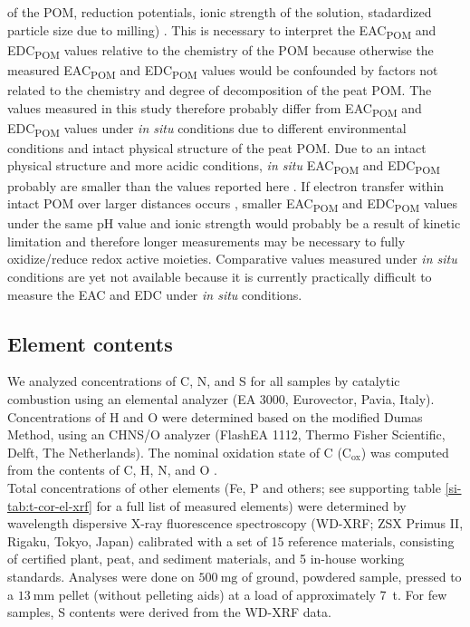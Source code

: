 \documentclass[draft,linenumbers]{agujournal2018}
\begin{document}
of the POM, reduction potentials, ionic strength of the solution,
stadardized particle size due to milling)
\citep{Aeschbacher.2012, Lu.2015}. This is necessary to interpret the
EAC\textsubscript{POM} and EDC\textsubscript{POM} values relative to the
chemistry of the POM because otherwise the measured
EAC\textsubscript{POM} and EDC\textsubscript{POM} values would be
confounded by factors not related to the chemistry and degree of
decomposition of the peat POM. The values measured in this study
therefore probably differ from EAC\textsubscript{POM} and
EDC\textsubscript{POM} values under \emph{in situ} conditions due to
different environmental conditions and intact physical structure of the
peat POM. Due to an intact physical structure and more acidic
conditions, \emph{in situ} EAC\textsubscript{POM} and
EDC\textsubscript{POM} probably are smaller than the values reported
here \citep{Aeschbacher.2012, Lu.2015}. If electron transfer within
intact POM over larger distances occurs \citep{Bai.2020}, smaller
EAC\textsubscript{POM} and EDC\textsubscript{POM} values under the same
pH value and ionic strength would probably be a result of kinetic
limitation and therefore longer measurements may be necessary to fully
oxidize/reduce redox active moieties. Comparative values measured under
\emph{in situ} conditions are yet not available because it is currently
practically difficult to measure the EAC and EDC under \emph{in situ}
conditions.

\subsection{Element contents}

We analyzed concentrations of C, N, and S for all samples by catalytic
combustion using an elemental analyzer (EA 3000, Eurovector, Pavia,
Italy). Concentrations of H and O were determined based on the modified
Dumas Method, using an CHNS/O analyzer (FlashEA 1112, Thermo Fisher
Scientific, Delft, The Netherlands). The nominal oxidation state of C
(C\(_\textrm{ox}\)) was computed from the contents of C, H, N, and O
\citep{Masiello.2008, Worrall.2016b}.\\
Total concentrations of other elements (Fe, P and others; see supporting
table \ref{si-tab:t-cor-el-xrf} for a full list of measured elements)
were determined by wavelength dispersive X-ray fluorescence spectroscopy
(WD-XRF; ZSX Primus II, Rigaku, Tokyo, Japan) calibrated with a set of
15 reference materials, consisting of certified plant, peat, and
sediment materials, and 5 in-house working standards. Analyses were done
on \(\SI{500}{\milli\g}\) of ground, powdered sample, pressed to a
\(\SI{13}{\milli\m}\) pellet (without pelleting aids) at a load of
approximately \SI{7}{\tonne}. For few samples, S contents were derived
from the WD-XRF data.
\end{document}
